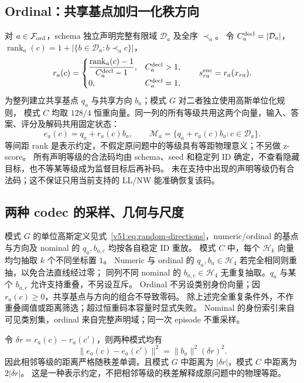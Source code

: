 \documentclass[11pt,UTF8,fontset=fandol]{ctexart}
\numberwithin{equation}{section}
\theoremstyle{definition}
\newcommand{\Fset}{\mathcal F}
\begin{document}

\subsection{Ordinal：共享基点加归一化秩方向}
对 $a\in\Fset_{\rm ord}$，schema 独立声明完整有限域 $\mathcal D_a$ 及全序 $\prec_a$。
令 $C_a^{\rm decl}=|\mathcal D_a|$，$\operatorname{rank}_a(c)=1+|\{b\in\mathcal D_a:b\prec_a c\}|$，
\begin{equation}
 r_a(c)=\begin{cases}
 \dfrac{\operatorname{rank}_a(c)-1}{C_a^{\rm decl}-1},&C_a^{\rm decl}>1,\\[4pt]
 0,&C_a^{\rm decl}=1,
 \end{cases}\qquad s^{\rm enc}_{ra}=r_a(x_{ra}).
 \label{eq:E:ordinal-prep}
\end{equation}
为整列建立共享基点 $q_a$ 与共享方向 $b_a$；模式 $G$ 对二者独立使用高斯单位化规则，
模式 $C$ 均取 $128/4$ 恒重向量。同一列的所有等级共用这两个向量，输入、答案、评分及解码共用固定状态：
\begin{equation}
 \boxed{e_a(c)=q_a+r_a(c)b_a},\qquad
 \mathcal M_a=\{q_a+r_a(c)b_a:c\in\mathcal D_a\}.
 \label{v53c:eq:ordinal-affine}
\end{equation}
等间距 rank 是表示约定，不假定原问题中的等级具有等距物理意义；不另做 z-score。
所有声明等级的合法码均由 schema、seed 和稳定列 ID 确定，不查看隐藏目标，也不等某等级成为监督目标后再补码。
未在支持中出现的声明等级仍有合法码；这不保证只用当前支持的 LL/NW 能准确恢复该码。

\subsection{两种 codec 的采样、几何与尺度}
\label{v53:app:codec-geometry}
模式 $G$ 的单位高斯定义见式~\eqref{v51:eq:random-directions}，numeric/ordinal 的基点与方向及 nominal 的 $q_a,b_{a,c}$ 均按各自稳定 ID 重放。
模式 $C$ 中，每个 $\mathcal H_k$ 向量均匀抽取 $k$ 个不同坐标置 $1$。
Numeric 与 ordinal 的 $q_a,b_a\in\mathcal H_4$ 若完全相同则重抽，以免合法直线经过零；
同列不同 nominal 的 $b_{a,c}\in\mathcal H_4$ 无重复抽取。$q_a$ 与某个 $b_{a,c}$ 允许支持重叠，不另设互斥。
Ordinal 不另设类别身份向量；因 $r_a(c)\ge0$，共享基点与方向的组合不导致零码。
除上述完全重复条件外，不作重叠阈值或距离筛选；超过恒重码本容量时显式失败。
Nominal 的身份索引来自可见类别集，ordinal 来自完整声明域；同一次 episode 不重采样。

令 $\delta r=r_a(c)-r_a(c')$，则两种模式均有
\begin{equation}
 \|e_a(c)-e_a(c')\|^2
 =\|b_a\|^2(\delta r)^2.
 \label{v53:eq:ordinal-identity-geometry}
\end{equation}
因此相邻等级的距离严格随秩差单调，且模式 $G$ 中距离为 $|\delta r|$，模式 $C$ 中距离为 $2|\delta r|$。
这是一种表示约定，不把相邻等级的秩差解释成原问题中的物理等距。
\end{document}
